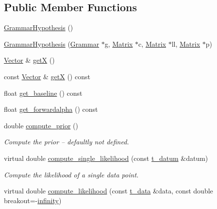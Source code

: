 \subsection*{Public Member Functions}
\begin{DoxyCompactItemize}
\item 
\hyperlink{class_grammar_hypothesis_afd02b96535124c5e205ce7185c64c862}{Grammar\+Hypothesis} ()
\item 
\hyperlink{class_grammar_hypothesis_afe25b747b37d7ae984f9d3e4187484d8}{Grammar\+Hypothesis} (\hyperlink{class_grammar}{Grammar} $\ast$g, \hyperlink{_eigen_numerics_8h_a645222978e81acfb2523a9bce34aecc0}{Matrix} $\ast$c, \hyperlink{_eigen_numerics_8h_a645222978e81acfb2523a9bce34aecc0}{Matrix} $\ast$ll, \hyperlink{_eigen_numerics_8h_a645222978e81acfb2523a9bce34aecc0}{Matrix} $\ast$p)
\item 
\hyperlink{_eigen_numerics_8h_aca2956bc379bce2ed88ab3c0e1b61d1d}{Vector} \& \hyperlink{class_grammar_hypothesis_a379e7af54d3e1cfd5b70f48fcc423470}{getX} ()
\item 
const \hyperlink{_eigen_numerics_8h_aca2956bc379bce2ed88ab3c0e1b61d1d}{Vector} \& \hyperlink{class_grammar_hypothesis_a2e6e231336e00b27bb0a0a1f039d80fa}{getX} () const
\item 
float \hyperlink{class_grammar_hypothesis_aa647148b440db9de4ca97f39c593a0d3}{get\+\_\+baseline} () const
\item 
float \hyperlink{class_grammar_hypothesis_a8ac03e561e97660e21669d0ddb64e028}{get\+\_\+forwardalpha} () const
\item 
double \hyperlink{class_grammar_hypothesis_a11fd75eee387330535601c9ee9d2f0f9}{compute\+\_\+prior} ()
\begin{DoxyCompactList}\small\item\em Compute the prior -- defaultly not defined. \end{DoxyCompactList}\item 
virtual double \hyperlink{class_grammar_hypothesis_a848ed67089c24b55cc61a4d84e350d05}{compute\+\_\+single\+\_\+likelihood} (const \hyperlink{class_bayesable_a7c93a2eeab708378eb321745908718d4}{t\+\_\+datum} \&datum)
\begin{DoxyCompactList}\small\item\em Compute the likelihood of a single data point. \end{DoxyCompactList}\item 
virtual double \hyperlink{class_grammar_hypothesis_ae565db71afc24d042450e9ed471b4908}{compute\+\_\+likelihood} (const \hyperlink{class_bayesable_a70a593a67c7d43239ecc06bb4fd06a6b}{t\+\_\+data} \&data, const double breakout=-\/\hyperlink{_numerics_8h_a1bb1e42ae1b40cad6e99da0aab8a5576}{infinity})

\end{DoxyCompactItemize}

